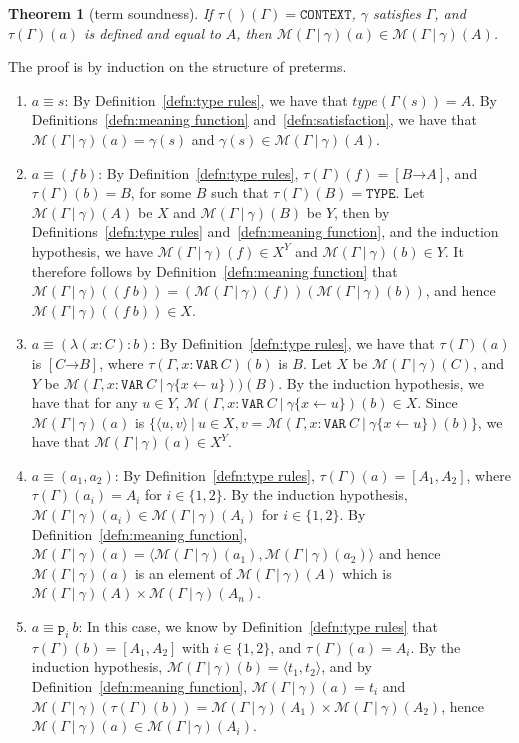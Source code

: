 \documentclass [12pt,twoside]{cslreport}
\newcommand{\thmbox}
   {{\ \hfill\hbox{%
      \vrule width1.0ex height1.0ex
   }\parfillskip 0pt }}
\newenvironment{proof}{{\bf Proof. }}{\thmbox}
\newcommand{\aro}{\mathord\rightarrow} %
\newcommand{\pair}[1]{\langle #1 \rangle}
\newcommand{\funtype}[2]{[#1 \aro #2]}
\newcommand{\tupletype}[1]{[#1]}
\newcommand{\tauGamma}[1]{\tau(\Gamma)(#1)}
\newcommand{\Mgamma}[1]{{\mathcal M}(\Gamma\vbar\gamma)(#1)}
\newcommand{\proj}[1]{\mathtt{p}_{#1}}
\newcommand{\listwo}[2]{#1_{1}, #1_{2}}
\newcommand{\tttype}{\mathtt{TYPE}}
\newcommand{\ttcontext}{\mathtt{CONTEXT}}
\newcommand{\ttvar}{\mathtt{VAR}}
\newcommand{\ittype}{\textit{type}}
\newcommand{\vbar}{\ |\ }
\newtheorem{theorem}{Theorem}
\begin{document}
\begin{theorem}[term soundness]\label{simple-term-semantics}
 If $\tau()(\Gamma) = \ttcontext$, 
   $\gamma$ satisfies $\Gamma$, and
   $\tauGamma{a}$ is defined and equal to $A$, then 
$\Mgamma{a} \in \Mgamma{A}$.  
\end{theorem}
\begin{proof}
The proof is by induction on the structure of preterms.
\begin{enumerate}
\item $a\equiv s$: By Definition~\ref{defn:type rules},
we have that $\ittype(\Gamma(s)) = A$\@.  By
Definitions~\ref{defn:meaning function}
and~\ref{defn:satisfaction}, we have that $\Mgamma{a} = \gamma(s)$
and $\gamma(s) \in
\Mgamma{A}$\@.
\item $a \equiv (f\ b)$:  By Definition~\ref{defn:type rules},
$\tauGamma{f} = \funtype{B}{A}$, and $\tauGamma{b} = B$, for some
$B$ such that $\tauGamma{B} = \tttype$\@.  
Let $\Mgamma{A}$ be $X$ and $\Mgamma{B}$ be $Y$, then 
by Definitions~\ref{defn:type rules}
and~\ref{defn:meaning function}, and the induction hypothesis, we have
$\Mgamma{f} \in X^Y$ and $\Mgamma{b}\in Y$\@.  It therefore follows
by Definition~\ref{defn:meaning function} that $\Mgamma{(f\ b)} =
(\Mgamma{f})(\Mgamma{b})$, and hence $\Mgamma{(f\ b)} \in X$\@.

\item $a \equiv (\lambda (x : C): b)$:  By
Definition~\ref{defn:type rules}, we have that
$\tauGamma{a}$ is $\funtype{C}{B}$, where
$\tau(\Gamma, x : \ttvar~C)(b)$ is $B$\@.  
Let $X$ be $\Mgamma{C}$, and $Y$ be
$\mathcal{M}(\Gamma, x: \ttvar~C \vbar \gamma\{x\gets u\}))(B)$\@.  
By the induction hypothesis, we have that for
any $u\in Y$, 
$\mathcal{M}(\Gamma, x: \ttvar~C \vbar \gamma\{x\gets u\})(b)
\in X$\@.  
Since $\Mgamma{a}$ is $\{\pair{u, v} \vbar u\in X, v = \mathcal{M}(\Gamma, x:
\ttvar~C \vbar \gamma\{x\gets u\})(b)\}$,
we have that $\Mgamma{a} \in X^Y$\@.

\item $a \equiv (a_1, a_2)$: By Definition~\ref{defn:type rules},
$\tauGamma{a} = \tupletype{\listwo{A}{n}}$, where $\tauGamma{a_i} = A_i$ for
$i\in \{1, 2\}$\@.   By the induction hypothesis, $\Mgamma{a_i}\in
\Mgamma{A_i}$ for $i\in \{1, 2\}$\@.  By
Definition~\ref{defn:meaning function}, $\Mgamma{a} =
\pair{\Mgamma{a_1},\Mgamma{a_2}}$ and hence $\Mgamma{a}$ is
an element of $\Mgamma{A}$ which is
$\Mgamma{A}\times\Mgamma{A_n}$\@.

\item $a\equiv \proj{i}~b$: In this case, we know by
Definition~\ref{defn:type rules} that $\tauGamma{b} =
\tupletype{\listwo{A}{n}}$
with $i\in \{1, 2\}$, and $\tauGamma{a} = A_i$\@.
By the induction hypothesis, $\Mgamma{b} = \pair{t_1, t_2}$,
and by Definition~\ref{defn:meaning function}, $\Mgamma{a} = t_i$
and $\Mgamma{\tauGamma{b}} =
\Mgamma{A_1}\times\Mgamma{A_2}$,
hence $\Mgamma{a}\in \Mgamma{A_i}$\@.  
\end{enumerate}
\end{proof}
\end{document}
